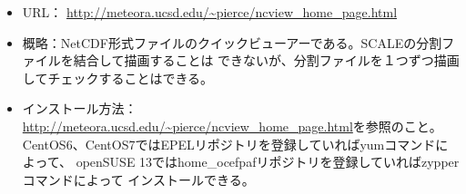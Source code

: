 \begin{itemize}
 \begin{itemize}
  \item URL： \url{http://meteora.ucsd.edu/~pierce/ncview_home_page.html}
  \item 概略：NetCDF形式ファイルのクイックビューアーである。SCALEの分割ファイルを結合して描画することは
             できないが、分割ファイルを１つずつ描画してチェックすることはできる。
  \item インストール方法：\url{http://meteora.ucsd.edu/~pierce/ncview_home_page.html}を参照のこと。
                        CentOS6、CentOS7ではEPELリポジトリを登録していればyumコマンドによって、
                        openSUSE 13ではhome\_ocefpafリポジトリを登録していればzypperコマンドによって
                        インストールできる。
 \end{itemize}
\end{itemize}





